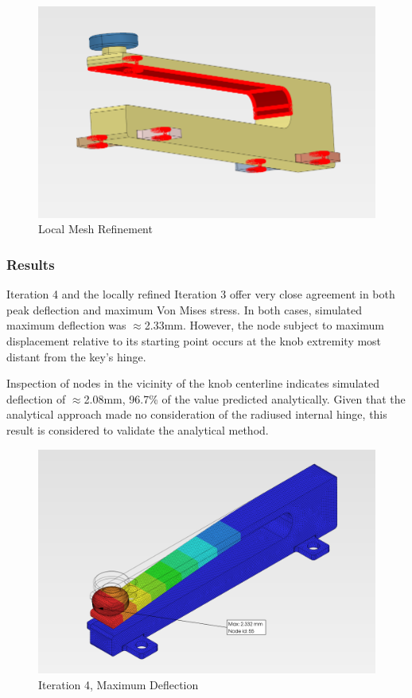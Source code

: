 \documentclass[10pt]{article}
\begin{document}
\begin{figure}[H]
	\centering
	\includegraphics[width=\textwidth]{./assets/13-local-refinement.png}
	\caption{Local Mesh Refinement}
	\label{fig:local-refinement}
\end{figure}

\subsubsection{Results}
Iteration 4 and the locally refined Iteration 3 offer very close agreement in both peak deflection
and maximum Von Mises stress. In both cases, simulated maximum deflection was $\approx$2.33mm.
However, the node subject to maximum displacement relative to its starting point occurs at the knob
extremity most distant from the key's hinge.

Inspection of nodes in the vicinity of the knob centerline indicates simulated deflection of
$\approx$2.08mm, 96.7\% of the value predicted analytically. Given that the analytical approach
made no consideration of the radiused internal hinge, this result is considered to validate the
analytical method.

\begin{figure}[H]
	\centering
	\includegraphics[width=\textwidth]{./assets/14-max-deflection.png}
	\caption{Iteration 4, Maximum Deflection}
	\label{fig:max-deflection}
\end{figure}
\end{document}
